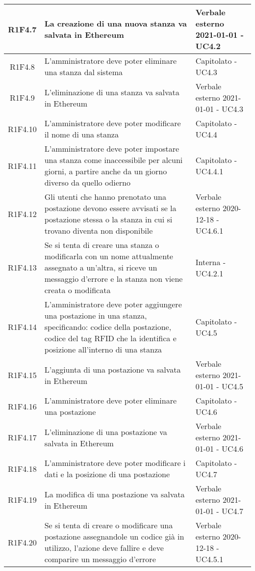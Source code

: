 \begin{center}
\begin{longtable}{|c|p{10cm}|p{4cm}|}
						\hline
				R1F4.7&	La creazione di una nuova stanza va salvata in Ethereum&Verbale esterno 2021-01-01 - UC4.2 	\\
						\hline
				R1F4.8&L'amministratore deve poter eliminare una stanza dal sistema	& Capitolato - UC4.3	\\
						\hline
				R1F4.9&L'eliminazione di una stanza va salvata in Ethereum	& Verbale esterno 2021-01-01 - UC4.3	\\
						\hline
				R1F4.10&L'amministratore deve poter modificare il nome di una stanza	& Capitolato - UC4.4	\\
						\hline
			R1F4.11&L'amministratore deve poter impostare una stanza come inaccessibile per alcuni giorni, a partire anche da un giorno diverso da quello odierno	& Capitolato - UC4.4.1	\\
					\hline
			R1F4.12&Gli utenti che hanno prenotato una postazione devono essere avvisati se la postazione stessa o la stanza in cui si trovano diventa non disponibile	& Verbale esterno 2020-12-18 - UC4.6.1	\\
					\hline
R1F4.13&Se si tenta di creare una stanza o modificarla con un nome attualmente assegnato a un'altra, si riceve un messaggio d'errore e la stanza non viene creata o modificata	& Interna - UC4.2.1	\\
						\hline
			R1F4.14&L'amministratore deve poter aggiungere una postazione in una stanza, specificando: codice della postazione, codice del tag RFID che la identifica e posizione all'interno di una stanza	& Capitolato - UC4.5	\\
					\hline
			R1F4.15&L'aggiunta di una postazione va salvata in Ethereum	&Verbale esterno 2021-01-01 - UC4.5 	\\
					\hline
R1F4.16&L'amministratore deve poter eliminare una postazione	& Capitolato - UC4.6	\\
						\hline
		R1F4.17	&L'eliminazione di una postazione va salvata in Ethereum	& Verbale esterno 2021-01-01 - UC4.6	\\
					\hline
			R1F4.18&L'amministratore deve poter modificare i dati e la posizione di una postazione	& Capitolato - UC4.7	\\
					\hline
R1F4.19&	La modifica di una postazione va salvata in Ethereum& Verbale esterno 2021-01-01 - UC4.7	\\
					\hline
R1F4.20&	Se si tenta di creare o modificare una postazione assegnandole un codice già in utilizzo, l'azione deve fallire e deve comparire un messaggio d'errore& Verbale esterno 2020-12-18 - UC4.5.1 	\\

\end{longtable}
\end{center}
